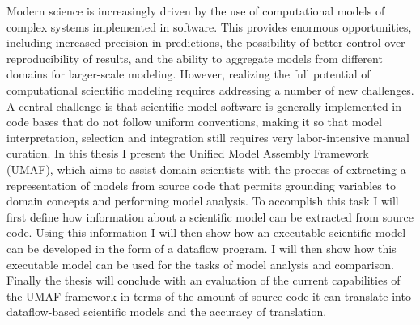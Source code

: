 
Modern science is increasingly driven by the use of computational models of complex systems implemented in software.
This provides enormous opportunities, including increased precision in predictions, the possibility of better control over reproducibility of results, and the ability to aggregate models from different domains for larger-scale modeling.
However, realizing the full potential of computational scientific modeling requires addressing a number of new challenges.
A central challenge is that scientific model software is generally implemented in code bases that do not follow uniform conventions, making it so that model interpretation, selection and integration still requires very labor-intensive manual curation.
In this thesis I present the Unified Model Assembly Framework (UMAF), which aims to assist domain scientists with the process of extracting a representation of models from source code that permits grounding variables to domain concepts and performing model analysis.
To accomplish this task I will first define how information about a scientific model can be extracted from source code.
Using this information I will then show how an executable scientific model can be developed in the form of a dataflow program.
I will then show how this executable model can be used for the tasks of model analysis and comparison.
Finally the thesis will conclude with an evaluation of the current capabilities of the UMAF framework in terms of the amount of source code it can translate into dataflow-based scientific models and the accuracy of translation.
